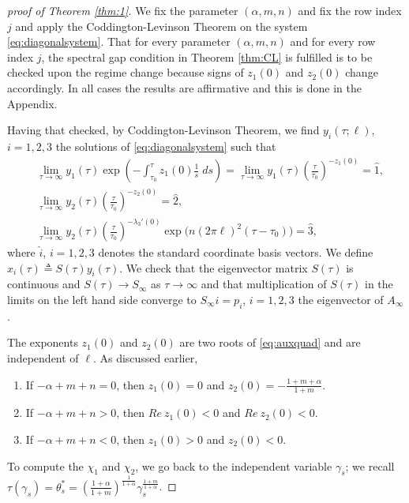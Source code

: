 \documentclass[a4paper,11pt]{article}
\def\l{(2\pi \ell)}
\theoremstyle{remark}
\begin{document}
\begin{proof}[proof of Theorem \ref{thm:1}]
We fix the parameter $(\alpha,m,n)$ and fix the row index $j$ and apply the Coddington-Levinson Theorem on the system \eqref{eq:diagonalsystem}. That for every parameter $(\alpha,m,n)$ and for every row index $j$, the spectral gap condition in Theorem \ref{thm:CL} is fulfilled is to be checked upon the regime change because signs of $z_1(0)$ and $z_2(0)$ change accordingly. In all cases the results are affirmative and this is done in the Appendix.

Having that checked, by Coddington-Levinson Theorem, we find $y_i(\tau;\ell)$, $i=1,2,3$ the solutions of \eqref{eq:diagonalsystem} such that
 \begin{align*}
 &\lim_{\tau \rightarrow \infty} y_1(\tau) \exp\left(-\int_{\tau_0}^\tau z_1(0)\frac{1}{s}\; ds\right) = \lim_{\tau \rightarrow \infty} y_1(\tau)\left(\frac{\tau}{\tau_0}\right)^{-z_1(0)} = \hat{1}, \\
 &\lim_{\tau \rightarrow \infty} y_2(\tau)\left(\frac{\tau}{\tau_0}\right)^{-z_2(0)} = \hat{2}, \\
 &\lim_{\tau \rightarrow \infty} y_2(\tau)\left(\frac{\tau}{\tau_0}\right)^{-\lambda_3'(0)}\exp\Big(n\l^2(\tau-\tau_0)\Big) = \hat{3},
 \end{align*}
 where $\hat{i}$, $i=1,2,3$ denotes the standard coordinate basis vectors. We define $x_i(\tau)\triangleq S(\tau)y_i(\tau)$. We check that the eigenvector matrix $S(\tau)$ is continuous and $S(\tau) \rightarrow S_\infty$ as $\tau \rightarrow \infty$ and that multiplication of $S(\tau)$ in the limits on the left hand side converge to $S_\infty \hat{i}=p_i$, $i=1,2,3$ the eigenvector of $A_\infty$.
 
 The exponents $z_1(0)$ and $z_2(0)$ are two roots of \eqref{eq:auxquad} and are independent of $\ell$. As discussed earlier,
 \begin{enumerate}
  \item If $-\alpha+m+n=0$, then $z_1(0)=0$ and $z_2(0)= -\frac{1+m+\alpha}{1+m}$.
  \item If $-\alpha+m+n>0$, then $Re ~z_1(0)<0$ and $Re ~z_2(0)<0$.
  \item If $-\alpha+m+n<0$, then $z_1(0)>0$ and $z_2(0)<0$.
 \end{enumerate}
To compute the $\chi_1$ and $\chi_2$, we go back to the independent variable $\gamma_s$; we recall $\tau(\gamma_s)= \theta_s^*=\left( \frac{1+\alpha}{1+m}\right)^{\frac{1}{1+\alpha}} \gamma_s^{\frac{1+m}{1+\alpha}}$. 
\end{proof}
\end{document}

